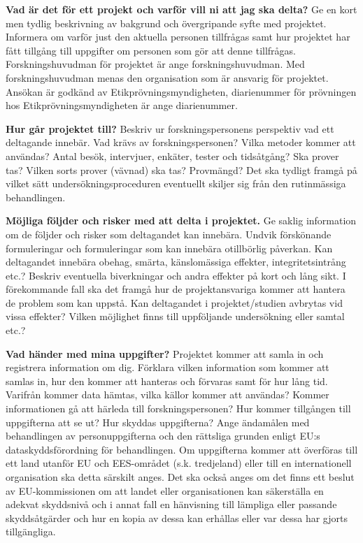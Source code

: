 \documentclass[
]{book}
\begin{document}
\textbf{Vad är det för ett projekt och varför vill ni att jag ska delta?} Ge en kort men tydlig beskrivning av bakgrund och övergripande syfte med projektet. Informera om varför just den aktuella personen tillfrågas samt hur projektet har fått tillgång till uppgifter om personen som gör att denne tillfrågas. Forskningshuvudman för projektet är ange forskningshuvudman. Med forskningshuvudman menas den organisation som är ansvarig för projektet. Ansökan är godkänd av Etikprövningsmyndigheten, diarienummer för prövningen hos Etikprövningsmyndigheten är ange diarienummer.

\textbf{Hur går projektet till?} Beskriv ur forskningspersonens perspektiv vad ett deltagande innebär. Vad krävs av forskningspersonen? Vilka metoder kommer att användas? Antal besök, intervjuer, enkäter, tester och tidsåtgång? Ska prover tas? Vilken sorts prover (vävnad) ska tas? Provmängd? Det ska tydligt framgå på vilket sätt undersökningsproceduren eventuellt skiljer sig från den rutinmässiga behandlingen.

\textbf{Möjliga följder och risker med att delta i projektet.} Ge saklig information om de följder och risker som deltagandet kan innebära. Undvik förskönande formuleringar och formuleringar som kan innebära otillbörlig påverkan. Kan deltagandet innebära obehag, smärta, känslomässiga effekter, integritetsintrång etc.? Beskriv eventuella biverkningar och andra effekter på kort och lång sikt. I förekommande fall ska det framgå hur de projektansvariga kommer att hantera de problem som kan uppstå. Kan deltagandet i projektet/studien avbrytas vid vissa effekter? Vilken möjlighet finns till uppföljande undersökning eller samtal etc.?

\textbf{Vad händer med mina uppgifter?} Projektet kommer att samla in och registrera information om dig. Förklara vilken information som kommer att samlas in, hur den kommer att hanteras och förvaras samt för hur lång tid. Varifrån kommer data hämtas, vilka källor kommer att användas? Kommer informationen gå att härleda till forskningspersonen? Hur kommer tillgången till uppgifterna att se ut? Hur skyddas uppgifterna? Ange ändamålen med behandlingen av personuppgifterna och den rättsliga grunden enligt EU:s dataskyddsförordning för behandlingen. Om uppgifterna kommer att överföras till ett land utanför EU och EES-området (s.k. tredjeland) eller till en internationell organisation ska detta särskilt anges. Det ska också anges om det finns ett beslut av EU-kommissionen om att landet eller organisationen kan säkerställa en adekvat skyddsnivå och i annat fall en hänvisning till lämpliga eller passande skyddsåtgärder och hur en kopia av dessa kan erhållas eller var dessa har gjorts tillgängliga.
\end{document}
